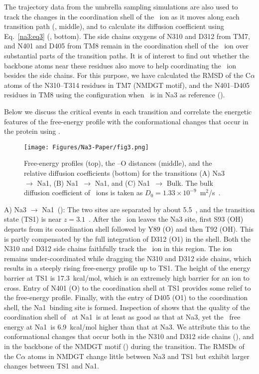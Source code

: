 The trajectory data from the umbrella sampling simulations are also used to track the changes in 
the coordination shell of the \Na\ ion as it moves along each transition path (, 
middle), and to calculate its diffusion coefficient using Eq.~\eqref{na3:eq3} (, 
bottom). The side chains oxygens of N310 and D312 from TM7, and N401 and D405 from TM8 remain in 
the coordination shell of the \Na\ ion over substantial parts of the transition paths. It is of 
interest to find out whether the backbone atoms near these residues also move to help coordinating 
the \Na\ ion besides the side chains. For this purpose, we have calculated the RMSD of the C$\alpha$ 
atoms of the N310--T314 residues in TM7 (NMDGT motif), and the N401--D405 residues in TM8 using 
the configuration when \Na\ is in Na3 as reference (). 

Below we discuss the critical events in each transition and correlate the energetic features of 
the free-energy profile with the conformational changes that occur in the protein using 
.

\begin{figure}[t!]
  \texttt{[image: Figures/Na3-Paper/fig3.png]}
\caption{Free-energy profiles (top), the \Na--O distances (middle), and the relative diffusion 
coefficients (bottom)  for the transitions 
(A) Na3 $\rightarrow$ Na1\prim, (B) Na1\prim\ $\rightarrow$ Na1\dprim,
and (C) Na1\dprim\ $\rightarrow$ Bulk. The bulk diffusion coefficient of \Na\ 
ions is taken as $D_0=1.33 \times 10^{-9}$~m$^2$/s~\cite{Harned1958}.}
\label{na3:fig3}
\end{figure}

A) Na3 $\rightarrow$ Na1\prim\ (): The two sites are separated by about 
5.5~\angs, and the transition state (TS1) is near $z=3.1$~\angs. After the \Na\ ion leaves the Na3 
site, first S93 (OH) departs from its coordination shell followed by Y89 (O) and then T92 (OH). This 
is partly compensated by the full integration of D312 (O1) in the shell. Both the N310 and D312 side 
chains faithfully track the \Na\ ion in this region. The ion remains under-coordinated while dragging 
the N310 and D312 side chains, which results in a steeply rising free-energy profile up to TS1. The 
height of the energy barrier at TS1 is 17.3~kcal/mol, which is an extremely high barrier for an ion 
to cross. Entry of N401 (O) to the coordination shell at TS1 provides some relief to the free-energy 
profile. Finally, with the entry of D405 (O1) to the coordination shell, the Na1\prim\ binding site is 
formed. Inspection of \tabref{na3:tab1} shows that the quality of the coordination shell of \Na\ at 
Na1\prim\ is at least as good as that at Na3, yet the \Na\ free energy at Na1\prim\ is 6.9~kcal/mol 
higher than that at Na3. We attribute this to the conformational changes that occur both in the N310 
and D312 side chains (\figrefi{na3:fig2}{A}), and in the backbone of the NMDGT motif () 
during the transition. The RMSDs of the C$\alpha$ atoms in NMDGT change little between Na3 and TS1 
but exhibit larger changes between TS1 and Na1\prim. 

